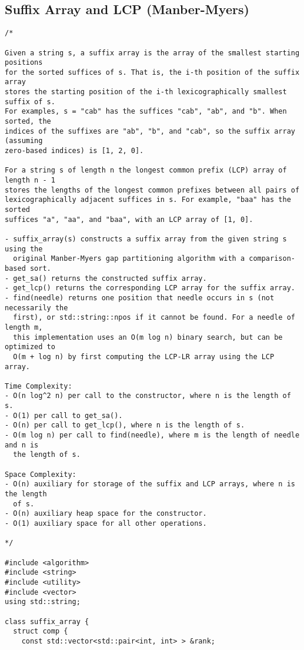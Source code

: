\subsection{Suffix Array and LCP (Manber-Myers)}
\begin{lstlisting}
/*

Given a string s, a suffix array is the array of the smallest starting positions
for the sorted suffices of s. That is, the i-th position of the suffix array
stores the starting position of the i-th lexicographically smallest suffix of s.
For examples, s = "cab" has the suffices "cab", "ab", and "b". When sorted, the
indices of the suffixes are "ab", "b", and "cab", so the suffix array (assuming
zero-based indices) is [1, 2, 0].

For a string s of length n the longest common prefix (LCP) array of length n - 1
stores the lengths of the longest common prefixes between all pairs of
lexicographically adjacent suffices in s. For example, "baa" has the sorted
suffices "a", "aa", and "baa", with an LCP array of [1, 0].

- suffix_array(s) constructs a suffix array from the given string s using the
  original Manber-Myers gap partitioning algorithm with a comparison-based sort.
- get_sa() returns the constructed suffix array.
- get_lcp() returns the corresponding LCP array for the suffix array.
- find(needle) returns one position that needle occurs in s (not necessarily the
  first), or std::string::npos if it cannot be found. For a needle of length m,
  this implementation uses an O(m log n) binary search, but can be optimized to
  O(m + log n) by first computing the LCP-LR array using the LCP array.

Time Complexity:
- O(n log^2 n) per call to the constructor, where n is the length of s.
- O(1) per call to get_sa().
- O(n) per call to get_lcp(), where n is the length of s.
- O(m log n) per call to find(needle), where m is the length of needle and n is
  the length of s.

Space Complexity:
- O(n) auxiliary for storage of the suffix and LCP arrays, where n is the length
  of s.
- O(n) auxiliary heap space for the constructor.
- O(1) auxiliary space for all other operations.

*/

#include <algorithm>
#include <string>
#include <utility>
#include <vector>
using std::string;

class suffix_array {
  struct comp {
    const std::vector<std::pair<int, int> > &rank;


\end{lstlisting}
